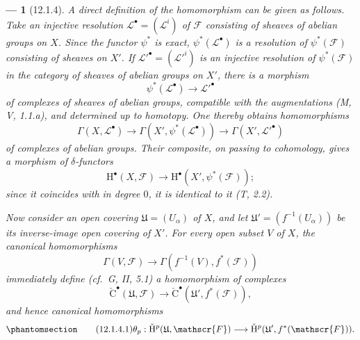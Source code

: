 \documentclass[oneside]{amsart}
\theoremstyle{ega-env-style}
\newtheorem*{env}{---}
\theoremstyle{ega-thm-env-style}
\theoremstyle{ega-defn-env-style}
\def\mathcal{\mathscr}
\def\sh{\mathcal}                   %
\def\HH{\mathrm{H}}                 %
\let\EGAOriginalLabel\label
\renewcommand{\label}[1]{\phantomsection\EGAOriginalLabel{#1}}
\begin{document}
\begin{env}[12.1.4]
\label{0.12.1.4}
A direct definition of the homomorphism  can be
given as follows.
Take an injective resolution
$\sh{L}^\bullet=(\sh{L}^i)$ of $\sh{F}$ consisting of sheaves of
abelian groups on $X$.
Since the functor $\psi^*$ is exact,
$\psi^*(\sh{L}^\bullet)$ is a resolution of $\psi^*(\sh{F})$
consisting of sheaves on $X'$.
If $\sh{L}'^\bullet=(\sh{L}'^i)$ is an injective resolution of
$\psi^*(\sh{F})$ in the category of sheaves of abelian groups on
$X'$, there is a morphism
\[
  \psi^*(\sh{L}^\bullet)\longrightarrow\sh{L}'^\bullet
\]
of complexes of sheaves of abelian groups, compatible with the
augmentations (M, V, 1.1.a), and determined up to homotopy.
One thereby obtains homomorphisms
\[
  \Gamma(X,\sh{L}^\bullet)
  \longrightarrow
  \Gamma(X',\psi^*(\sh{L}^\bullet))
  \longrightarrow
  \Gamma(X',\sh{L}'^\bullet)
\]
of complexes of abelian groups.
Their composite, on passing to cohomology, gives a morphism of
$\delta$-functors
\[
  \HH^\bullet(X,\sh{F})
  \longrightarrow
  \HH^\bullet(X',\psi^*(\sh{F}));
\]
since it coincides with  in degree $0$, it is
identical to it (T, 2.2).

Now consider an open covering
$\mathfrak{U}=(U_\alpha)$ of $X$, and let
$\mathfrak{U}'=(f^{-1}(U_\alpha))$ be its inverse-image open covering
of $X'$.
For every open subset $V$ of $X$, the canonical homomorphisms
\[
  \Gamma(V,\sh{F})
  \longrightarrow
  \Gamma(f^{-1}(V),f^*(\sh{F}))
\]
immediately define (cf.\ G, II, 5.1) a homomorphism of complexes
\[
  \check{\mathrm{C}}^\bullet(\mathfrak{U},\sh{F})
  \longrightarrow
  \check{\mathrm{C}}^\bullet(\mathfrak{U}',f^*(\sh{F})),
\]
and hence canonical homomorphisms
\[
\label{0.12.1.4.1}
\tag{12.1.4.1}
  \theta_p:
  \check{\HH}^p(\mathfrak{U},\sh{F})
  \longrightarrow
  \check{\HH}^p(\mathfrak{U}',f^*(\sh{F})).
\]


\end{env}
\end{document}
